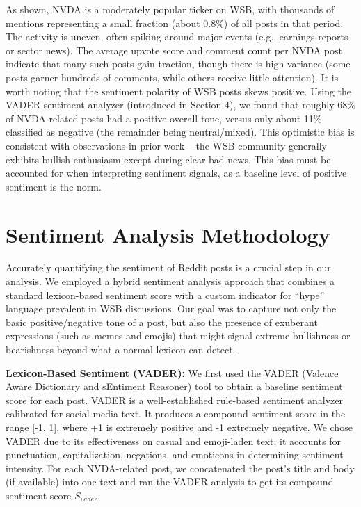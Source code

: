 \documentclass[conference]{IEEEtran}
\begin{document}
As shown, NVDA is a moderately popular ticker on WSB, with thousands of mentions representing a small fraction (about 0.8\%) of all posts in that period. The activity is uneven, often spiking around major events (e.g., earnings reports or sector news). The average upvote score and comment count per NVDA post indicate that many such posts gain traction, though there is high variance (some posts garner hundreds of comments, while others receive little attention). It is worth noting that the sentiment polarity of WSB posts skews positive. Using the VADER sentiment analyzer (introduced in Section 4), we found that roughly 68\% of NVDA-related posts had a positive overall tone, versus only about 11\% classified as negative (the remainder being neutral/mixed). This optimistic bias is consistent with observations in prior work -- the WSB community generally exhibits bullish enthusiasm except during clear bad news. This bias must be accounted for when interpreting sentiment signals, as a baseline level of positive sentiment is the norm.

\section{Sentiment Analysis Methodology}
Accurately quantifying the sentiment of Reddit posts is a crucial step in our analysis. We employed a hybrid sentiment analysis approach that combines a standard lexicon-based sentiment score with a custom indicator for “hype” language prevalent in WSB discussions. Our goal was to capture not only the basic positive/negative tone of a post, but also the presence of exuberant expressions (such as memes and emojis) that might signal extreme bullishness or bearishness beyond what a normal lexicon can detect.

\textbf{Lexicon-Based Sentiment (VADER):} We first used the VADER (Valence Aware Dictionary and sEntiment Reasoner) tool to obtain a baseline sentiment score for each post. VADER is a well-established rule-based sentiment analyzer calibrated for social media text. It produces a compound sentiment score in the range [-1, 1], where +1 is extremely positive and -1 extremely negative. We chose VADER due to its effectiveness on casual and emoji-laden text; it accounts for punctuation, capitalization, negations, and emoticons in determining sentiment intensity. For each NVDA-related post, we concatenated the post’s title and body (if available) into one text and ran the VADER analysis to get its compound sentiment score $S_{vader}$.
\end{document}
